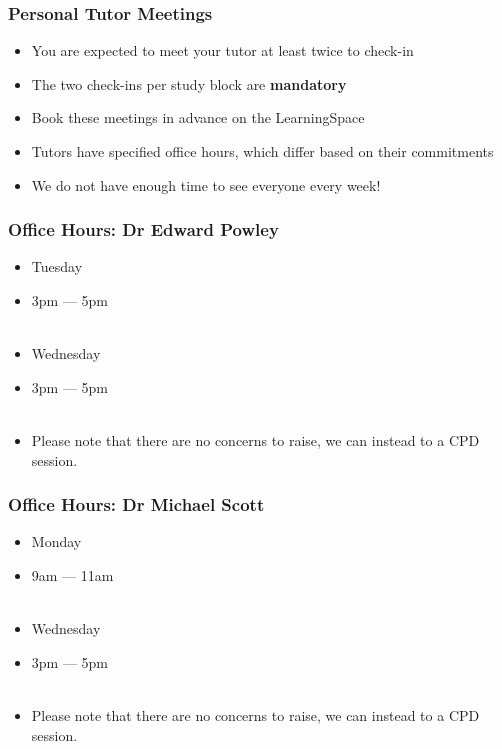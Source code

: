 \begin{frame}
	\frametitle{Personal Tutor Meetings}	
	\begin{itemize}
		\item You are expected to meet your tutor at least twice to check-in
		\item The two check-ins per study block are \textbf{mandatory}
		\item Book these meetings in advance on the LearningSpace
		
		\item Tutors have specified office hours, which differ based on their commitments
		\item We do not have enough time to see everyone every week! 
	\end{itemize}
\end{frame}

\begin{frame}
	\frametitle{Office Hours: Dr Edward Powley}	
	\begin{itemize}
		\item Tuesday
		\item 3pm --- 5pm
		\\~\\
	
		\item Wednesday
		\item 3pm --- 5pm
		\\~\\
		\item Please note that there are no concerns to raise, we can instead to a CPD session.
	\end{itemize}
\end{frame}

\begin{frame}
	\frametitle{Office Hours: Dr Michael Scott}	
	\begin{itemize}
		\item Monday
		\item 9am --- 11am
		\\~\\
	
		\item Wednesday
		\item 3pm --- 5pm
		\\~\\
		\item Please note that there are no concerns to raise, we can instead to a CPD session.
	\end{itemize}
\end{frame}

